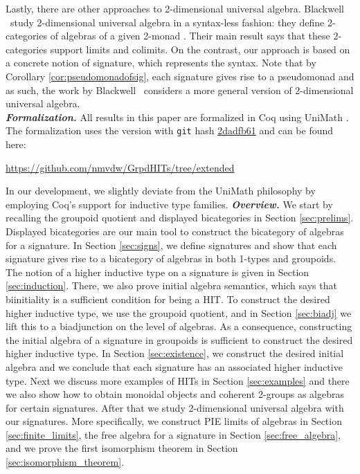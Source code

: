 Lastly, there are other approaches to 2-dimensional universal algebra.
Blackwell \etal \ study 2-dimensional universal algebra in a syntax-less fashion: they define 2-categories of algebras of a given 2-monad \cite{blackwell1989two}.
Their main result says that these 2-categories support limits and colimits.
On the contrast, our approach is based on a concrete notion of signature, which represents the syntax.
Note that by Corollary \ref{cor:pseudomonadofsig}, each signature gives rise to a pseudomonad and as such, the work by Blackwell \etal \ considers a more general version of 2-dimensional universal algebra.
\\
\emph{\textbf{Formalization.}}
All results in this paper are formalized in Coq \cite{Coq:manual} using UniMath \cite{UniMath}.
The formalization uses the version with \texttt{git} hash \href{https://github.com/UniMath/UniMath/tree/2dadfb61f5ef0d9805cf0eb6b80ef2beb26472d5}{2dadfb61} and can be found here:
\begin{center}
\url{https://github.com/nmvdw/GrpdHITs/tree/extended}
\end{center}
In our development, we slightly deviate from the UniMath philosophy by employing Coq's support for inductive type families.
\emph{\textbf{Overview.}}
We start by recalling the groupoid quotient and displayed bicategories in Section \ref{sec:prelims}.
Displayed bicategories are our main tool to construct the bicategory of algebras for a signature.
In Section \ref{sec:signs}, we define signatures and show that each signature gives rise to a bicategory of algebras in both 1-types and groupoids.
The notion of a higher inductive type on a signature is given in Section \ref{sec:induction}.
There, we also prove initial algebra semantics, which says that biinitiality is a sufficient condition for being a HIT.
To construct the desired higher inductive type, we use the groupoid quotient, and in Section \ref{sec:biadj} we lift this to a biadjunction on the level of algebras.
As a consequence, constructing the initial algebra of a signature in groupoids is sufficient to construct the desired higher inductive type.
In Section \ref{sec:existence}, we construct the desired initial algebra and we conclude that each signature has an associated higher inductive type. 
Next we discuss more examples of HITs in Section \ref{sec:examples} and there we also show how to obtain monoidal objects and coherent 2-groups as algebras for certain signatures.
After that we study 2-dimensional universal algebra with our signatures.
More specifically, we construct PIE limits of algebras in Section \ref{sec:finite_limits}, the free algebra for a signature in Section \ref{sec:free_algebra}, and we prove the first isomorphism theorem in Section \ref{sec:isomorphism_theorem}.
